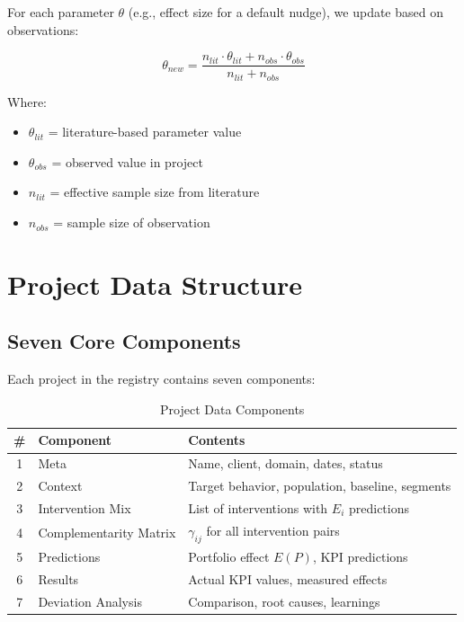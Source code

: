 For each parameter $\theta$ (e.g., effect size for a default nudge), we update based on observations:

\begin{equation}
\theta_{new} = \frac{n_{lit} \cdot \theta_{lit} + n_{obs} \cdot \theta_{obs}}{n_{lit} + n_{obs}}
\end{equation}

Where:
\begin{itemize}
    \item $\theta_{lit}$ = literature-based parameter value
    \item $\theta_{obs}$ = observed value in project
    \item $n_{lit}$ = effective sample size from literature
    \item $n_{obs}$ = sample size of observation
\end{itemize}

\section{Project Data Structure}

\subsection{Seven Core Components}

Each project in the registry contains seven components:

\begin{table}[h]
\centering
\begin{tabular}{clp{7cm}}
\toprule
\textbf{\#} & \textbf{Component} & \textbf{Contents} \\
\midrule
1 & Meta & Name, client, domain, dates, status \\
2 & Context & Target behavior, population, baseline, segments \\
3 & Intervention Mix & List of interventions with $E_i$ predictions \\
4 & Complementarity Matrix & $\gamma_{ij}$ for all intervention pairs \\
5 & Predictions & Portfolio effect $E(P)$, KPI predictions \\
6 & Results & Actual KPI values, measured effects \\
7 & Deviation Analysis & Comparison, root causes, learnings \\
\bottomrule
\end{tabular}
\caption{Project Data Components}
\end{table}

